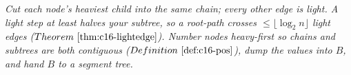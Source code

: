 \begin{recallbox}
\emph{Cut each node's heaviest child into the same chain; every other edge is light.  A light step at least halves your subtree, so a root-path crosses \(\le\lfloor\log_2 n\rfloor\) light edges (\(\thmref{c16-lightedge}\)).  Number nodes heavy-first so chains \emph{and} subtrees are both contiguous (\(\defref{c16-pos}\)), dump the values into \(B\), and hand \(B\) to a segment tree.}
\end{recallbox}
